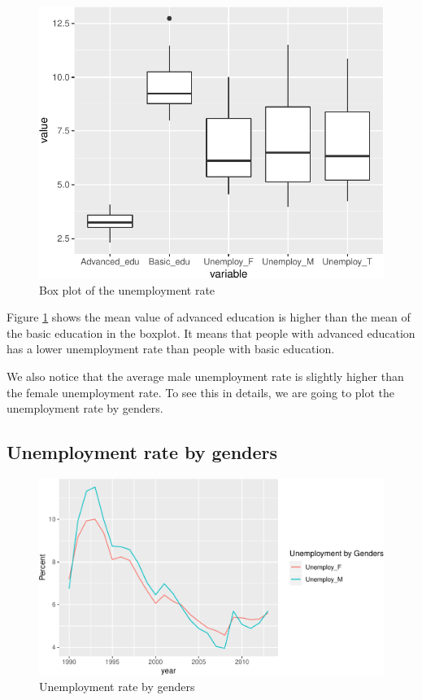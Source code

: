 \documentclass[11pt,a4paper,]{article}
\begin{document}
\begin{figure}[H]

{\centering \includegraphics{Figures/boxplot-1} 

}

\caption{Box plot of the unemployment rate}\label{fig:boxplot}
\end{figure}

Figure \ref{fig:boxplot} shows the mean value of advanced education is higher than the mean of the basic education in the boxplot. It means that people with advanced education has a lower unemployment rate than people with basic education.

We also notice that the average male unemployment rate is slightly higher than the female unemployment rate. To see this in details, we are going to plot the unemployment rate by genders.

\subsection{Unemployment rate by genders}

\begin{figure}[H]

{\centering \includegraphics{Figures/gender-1} 

}

\caption{Unemployment rate by genders}\label{fig:gender}
\end{figure}
\end{document}
